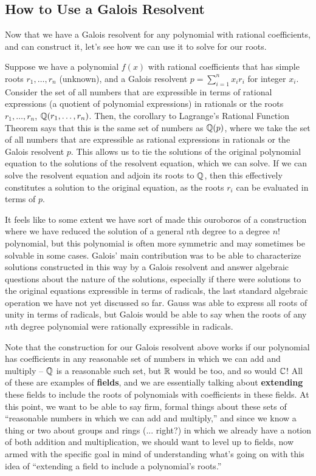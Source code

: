 \documentclass[12pt]{scrartcl}
\begin{document}
\subsection{How to Use a Galois Resolvent}
Now that we have a Galois resolvent for any polynomial with rational coefficients, and can construct it, let's see how we can use it to solve for our roots. 

Suppose we have a polynomial $f(x)$ with rational coefficients that has simple roots $r_1, \dots, r_n$ (unknown), and a Galois resolvent $p = \sum_{i=1}^n x_i r_i$ for integer $x_i$. Consider the set of all numbers that are expressible in terms of rational expressions (a quotient of polynomial expressions) in rationals or the roots $r_1, \dots, r_n$, $\mathbb Q(r_1, \dots, r_n)$. Then, the corollary to Lagrange's Rational Function Theorem says that this is the same set of numbers as $\mathbb Q(p)$, where we take the set of all numbers that are expressible as rational expressions in rationals or the Galois resolvent $p$. This allows us to tie the solutions of the original polynomial equation to the solutions of the resolvent equation, which we can solve. If we can solve the resolvent equation and adjoin its roots to $\mathbb Q$, then this effectively constitutes a solution to the original equation, as the roots $r_i$ can be evaluated in terms of $p$. 

It feels like to some extent we have sort of made this ouroboros of a construction where we have reduced the solution of a general $n$th degree to a degree $n!$ polynomial, but this polynomial is often more symmetric and may sometimes be solvable in some cases. Galois' main contribution was to be able to characterize solutions constructed in this way by a Galois resolvent and answer algebraic questions about the nature of the solutions, especially if there were solutions to the original equations expressible in terms of radicals, the last standard algebraic operation we have not yet discussed so far. Gauss was able to express all roots of unity in terms of radicals, but Galois would be able to say when the roots of any $n$th degree polynomial were rationally expressible in radicals. 

Note that the construction for our Galois resolvent above works if our polynomial has coefficients in any reasonable set of numbers in which we can add and multiply -- $\mathbb Q$ is a reasonable such set, but $\mathbb R$ would be too, and so would $\mathbb C$! All of these are examples of \textbf{fields}, and we are essentially talking about \textbf{extending} these fields to include the roots of polynomials with coefficients in these fields. At this point, we want to be able to say firm, formal things about these sets of ``reasonable numbers in which we can add and multiply,'' and since we know a thing or two about groups and rings (... right?) in which we already have a notion of both addition and multiplication, we should want to level up to fields, now armed with the specific goal in mind of understanding what's going on with this idea of ``extending a field to include a polynomial's roots.'' 
\end{document}
